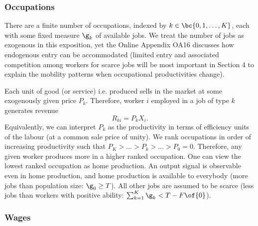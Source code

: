 \documentclass[12pt]{article}
\theoremstyle{definition}
\begin{document}
\subsubsection{Occupations}

There are a finite number of occupations, indexed by $k \in \bc{0, 1, \ldots, K}$, each with some fixed measure $\g_k$ of available jobs. We treat the number of jobs as exogenous in this exposition, yet the Online Appendix OA16 discusses how endogenous entry can be accommodated (limited entry and associated competition among workers for scarce jobs will be most important in Section 4 to explain the mobility patterns when occupational productivities change).

Each unit of good (or service) i.e. produced sells in the market at some exogenously given price $P_k$. Therefore, worker $i$ employed in a job of type $k$ generates revenue 
\begin{equation}
    \label{groesUShapesOccupationalMobility2015_eq4}
    R_{ki} = P_k X_i.
\end{equation}
Equivalently, we can interpret $P_k$ as the productivity in terms of efficiency units of the labour (at a common sale price of unity). We rank occupations in order of increasing productivity such that $P_K > \ldots > P_{k} > \ldots > P_0 = 0$. Therefore, any given worker produces more in a higher ranked occupation. One can view the lowest ranked occupation as home production. An output signal is observable even in home production, and home production is available to everybody (more jobs than population size: $\g_0 \geq T$). All other jobs are assumed to be scarce (less jobs than workers with  positive ability: $\sum_{k=1}^{K} \g_k < T - F\of{0}$).

\subsubsection{Wages}
\end{document}
